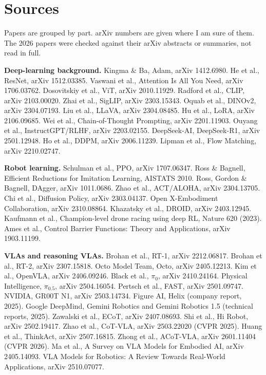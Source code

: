 \section*{Sources}
\small
Papers are grouped by part. arXiv numbers are given where I am sure of them. The 2026 papers were checked against their arXiv abstracts or summaries, not read in full.

\textbf{Deep-learning background.}
Kingma \& Ba, Adam, arXiv 1412.6980.
He et al., ResNet, arXiv 1512.03385.
Vaswani et al., Attention Is All You Need, arXiv 1706.03762.
Dosovitskiy et al., ViT, arXiv 2010.11929.
Radford et al., CLIP, arXiv 2103.00020.
Zhai et al., SigLIP, arXiv 2303.15343.
Oquab et al., DINOv2, arXiv 2304.07193.
Liu et al., LLaVA, arXiv 2304.08485.
Hu et al., LoRA, arXiv 2106.09685.
Wei et al., Chain-of-Thought Prompting, arXiv 2201.11903.
Ouyang et al., InstructGPT/RLHF, arXiv 2203.02155.
DeepSeek-AI, DeepSeek-R1, arXiv 2501.12948.
Ho et al., DDPM, arXiv 2006.11239.
Lipman et al., Flow Matching, arXiv 2210.02747.

\textbf{Robot learning.}
Schulman et al., PPO, arXiv 1707.06347.
Ross \& Bagnell, Efficient Reductions for Imitation Learning, AISTATS 2010.
Ross, Gordon \& Bagnell, DAgger, arXiv 1011.0686.
Zhao et al., ACT/ALOHA, arXiv 2304.13705.
Chi et al., Diffusion Policy, arXiv 2303.04137.
Open X-Embodiment Collaboration, arXiv 2310.08864.
Khazatsky et al., DROID, arXiv 2403.12945.
Kaufmann et al., Champion-level drone racing using deep RL, Nature 620 (2023).
Ames et al., Control Barrier Functions: Theory and Applications, arXiv 1903.11199.

\textbf{VLAs and reasoning VLAs.}
Brohan et al., RT-1, arXiv 2212.06817.
Brohan et al., RT-2, arXiv 2307.15818.
Octo Model Team, Octo, arXiv 2405.12213.
Kim et al., OpenVLA, arXiv 2406.09246.
Black et al., $\pi_0$, arXiv 2410.24164.
Physical Intelligence, $\pi_{0.5}$, arXiv 2504.16054.
Pertsch et al., FAST, arXiv 2501.09747.
NVIDIA, GR00T N1, arXiv 2503.14734.
Figure AI, Helix (company report, 2025).
Google DeepMind, Gemini Robotics and Gemini Robotics 1.5 (technical reports, 2025).
Zawalski et al., ECoT, arXiv 2407.08693.
Shi et al., Hi Robot, arXiv 2502.19417.
Zhao et al., CoT-VLA, arXiv 2503.22020 (CVPR 2025).
Huang et al., ThinkAct, arXiv 2507.16815.
Zhong et al., ACoT-VLA, arXiv 2601.11404 (CVPR 2026).
Ma et al., A Survey on VLA Models for Embodied AI, arXiv 2405.14093.
VLA Models for Robotics: A Review Towards Real-World Applications, arXiv 2510.07077.

